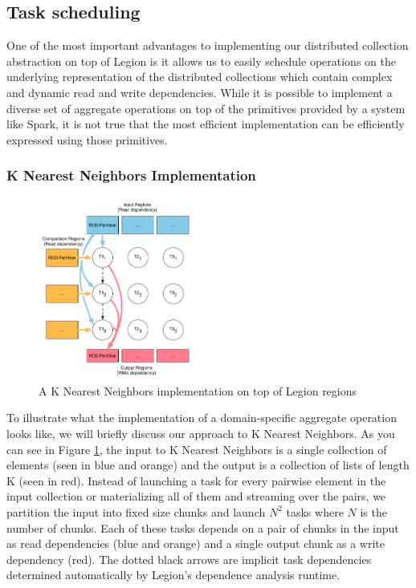 \documentclass[tog]{acmsiggraph}
\begin{document}

\subsection{Task scheduling}

One of the most important advantages to implementing our distributed
collection abstraction on top of Legion is it allows us to easily schedule
operations on the underlying representation of the distributed collections
which contain complex and dynamic read and write dependencies. While it is
possible to implement a diverse set of aggregate operations on top of the
primitives provided by a system like Spark, it is not true that the most
efficient implementation can be efficiently expressed using those primitives.

\subsubsection{K Nearest Neighbors Implementation}

\begin{figure}
\includegraphics[width=0.45\textwidth]{figures/knn}
\caption{A K Nearest Neighbors implementation on top of Legion regions}
\label{fig:knn}
\end{figure}

To illustrate what the implementation of a domain-specific aggregate operation
looks like, we will briefly discuss our approach to K Nearest Neighbors. As you
can see in Figure \ref{fig:knn}, the input to K Nearest Neighbors is a single
collection of elements (seen in blue and orange) and the output is a collection
of lists of length K (seen in red). Instead of launching a task for every
pairwise element in the input collection or materializing all of them and
streaming over the pairs, we partition the input into fixed size chunks and
launch \(N^2\) tasks where \(N\) is the number of chunks. Each of these tasks
depends on a pair of chunks in the input as read dependencies (blue and orange)
and a single output chunk as a write dependency (red). The dotted black arrows
are implicit task dependencies determined automatically by Legion's dependence
analysis runtime.
\end{document}
